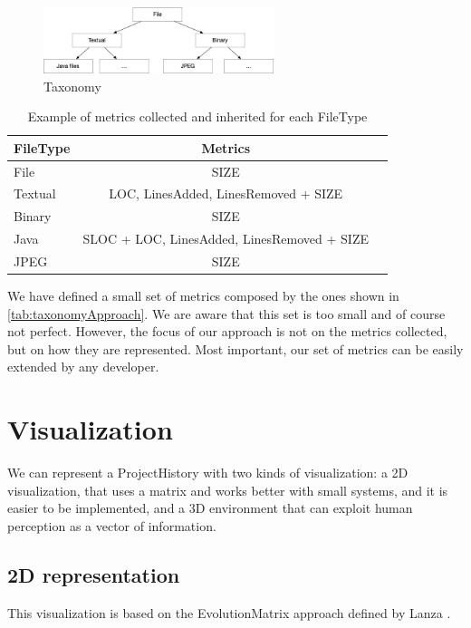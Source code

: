 \begin{figure}
    \center
    \includegraphics[width=0.6\textwidth]{Taxonomy.jpg}
    \caption{Taxonomy}
    \label{fig:taxonomy}
\end{figure}

\begin{table}[ht]
    \centering
    \begin{tabular}{lcr} \hline
    {\bf FileType} & {\bf Metrics}\\ \hline
    File    & SIZE      \\
    Textual & LOC, LinesAdded, LinesRemoved + SIZE \\
    Binary  & SIZE         \\
    Java    & SLOC + LOC, LinesAdded, LinesRemoved + SIZE \\
    JPEG    & SIZE \\
    \end{tabular}
    \label{tab:taxonomyApproach}
    \caption[]{Example of metrics collected and inherited for each FileType}
\end{table}

We have defined a small set of metrics composed by the ones shown in \autoref{tab:taxonomyApproach}. We are aware that this set is too small and of course not perfect. However, the focus of our approach is not on the metrics collected, but on how they are represented. Most important, our set of metrics can be easily extended by any developer.


\section{Visualization}
We can represent a ProjectHistory with two kinds of visualization: a 2D visualization,
 that uses a matrix and works better with small systems, and it is easier to be implemented,
  and a 3D environment that can exploit human perception as a vector of information. 


\subsection{2D representation}
This visualization is based on the EvolutionMatrix approach defined by Lanza \cite{Lanza2001}. 

